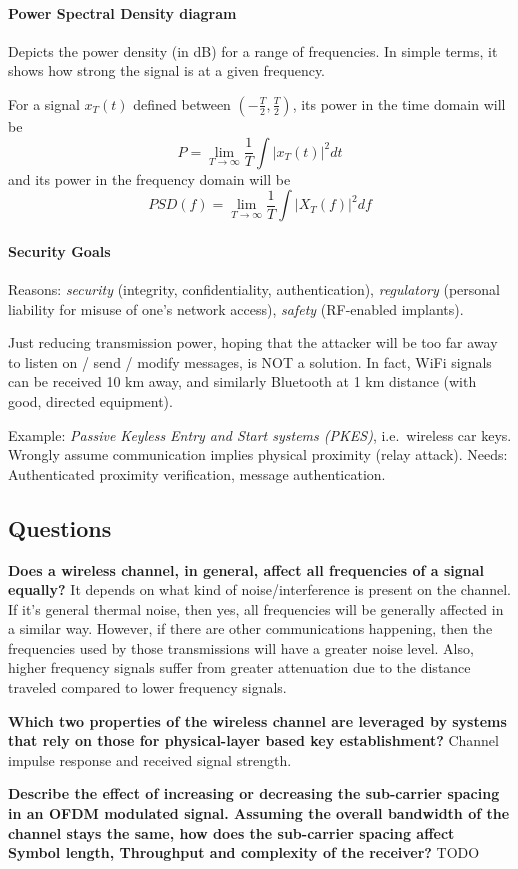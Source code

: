 \paragraph{Power Spectral Density diagram}
Depicts the power density (in dB) for a range of frequencies. In simple terms,
it shows how strong the signal is at a given frequency.

For a signal $x_T(t)$ defined between $(-\frac{T}{2}, \frac{T}{2})$, its power
in the time domain will be \[P = \lim_{T\rightarrow \infty} \frac{1}{T} \int |x_T(t)|^2 dt \] and its power in the frequency domain will be \[PSD(f) = \lim_{T\rightarrow \infty} \frac{1}{T} \int |X_T(f)|^2 df \]

\paragraph{Security Goals}
Reasons: \textit{security} (integrity, confidentiality, authentication),
\textit{regulatory} (personal liability for misuse of one's network access),
\textit{safety} (RF-enabled implants).

Just reducing transmission power, hoping that the attacker will be too far away
to listen on / send / modify messages, is NOT a solution. In fact, WiFi signals
can be received 10 km away, and similarly Bluetooth at 1 km distance (with
good, directed equipment).

Example: \textit{Passive Keyless Entry and Start systems (PKES)}, i.e.\
wireless car keys. Wrongly assume communication implies physical proximity
(relay attack). Needs: Authenticated proximity verification, message
authentication.

\subsection{Questions}
\textbf{Does a wireless channel, in general, affect all frequencies of a signal equally?} It depends on what kind of noise/interference is present on the channel. If it's general thermal noise, then yes, all frequencies will be generally affected in a similar way. However, if there are other communications happening, then the frequencies used by those transmissions will have a greater noise level.
Also, higher frequency signals suffer from greater attenuation due to the distance traveled compared to lower frequency signals.

\textbf{Which two properties of the wireless channel are leveraged by systems that rely on those for physical-layer based key establishment?} Channel impulse response and received signal strength.

\textbf{Describe the effect of increasing or decreasing the sub-carrier spacing in an OFDM modulated signal. Assuming the overall bandwidth of the channel stays the same, how does the sub-carrier spacing affect Symbol length, Throughput and complexity of the receiver?} TODO %
